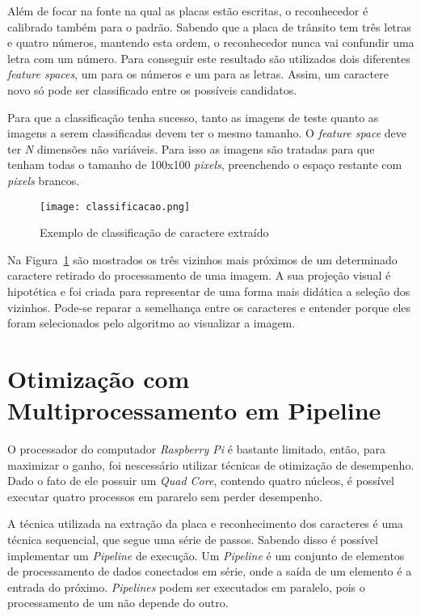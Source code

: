 Além de focar na fonte na qual as placas estão escritas, o reconhecedor é calibrado também para o padrão. Sabendo que a placa de trânsito tem três letras e quatro números, mantendo esta ordem, o reconhecedor nunca vai confundir uma letra com um número. Para conseguir este resultado são utilizados dois diferentes \emph{feature spaces}, um para os números e um para as letras. Assim, um caractere novo só pode ser classificado entre os possíveis candidatos.

Para que a classificação tenha sucesso, tanto as imagens de teste quanto as imagens a serem classificadas devem ter o mesmo tamanho. O \emph{feature space} deve ter \emph{N} dimensões não variáveis. Para isso as imagens são tratadas para que tenham todas o tamanho de 100x100 \emph{pixels}, preenchendo o espaço restante com \emph{pixels} brancos.

\begin{figure}[H]
	\centering
	\texttt{[image: classificacao.png]}
	\caption{Exemplo de classificação de caractere extraído}
	\label{fig:classificacao}
\end{figure}

Na Figura~\ref{fig:classificacao} são mostrados os três vizinhos mais próximos de um determinado caractere retirado do processamento de uma imagem. A sua projeção visual é hipotética e foi criada para representar de uma forma mais didática a seleção dos vizinhos. Pode-se reparar a semelhança entre os caracteres e entender porque eles foram selecionados pelo algoritmo ao visualizar a imagem.

\section{Otimização com Multiprocessamento em Pipeline} \label{sec:otimizacao}

O processador do computador \emph{Raspberry Pi} é bastante limitado, então, para maximizar o ganho, foi nescessário utilizar técnicas de otimização de desempenho. Dado o fato de ele possuir um \emph{Quad Core}, contendo quatro núcleos, é possível executar quatro processos em pararelo sem perder desempenho. 

A técnica utilizada na extração da placa e reconhecimento dos caracteres é uma técnica sequencial, que segue uma série de passos. Sabendo disso é possível implementar um \emph{Pipeline} de execução. Um \emph{Pipeline} é um conjunto de elementos de processamento de dados conectados em série, onde a saída de um elemento é a entrada do próximo. \emph{Pipelines} podem ser executados em paralelo, pois o processamento de um não depende do outro.


